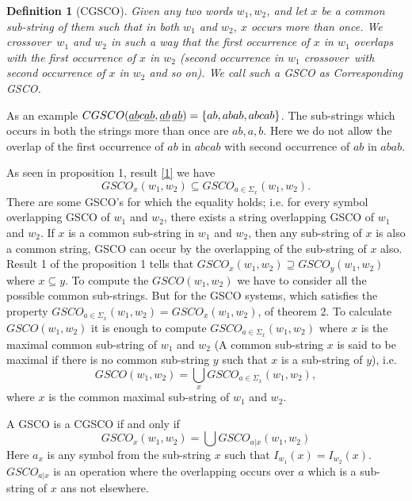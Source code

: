 \documentclass{llncs}
\newtheorem{defin}{Definition}
\newcommand{\sae}{crossover~}
\newcommand{\sg}{\Sigma}
\begin{document}
\begin{defin}[CGSCO]
Given any two words $w_1,w_2$, and let $x$ be a common sub-string of
them such that in both $w_1$ and $w_2,~x$ occurs more than once. We
\sae $w_1$ and $w_2$ in such a way that the first occurrence of $x$
in $w_1$ overlaps with the   first occurrence of $x$ in $w_2$
(second occurrence in $w_1$ \sae with second occurrence of $x$ in
$w_2$ and so on). We call such a GSCO as Corresponding GSCO.
\end{defin}
\par As an example $CGSCO(\underline{ab}c\underline{ab},
\underline{ab}\hspace{0.5mm}\underline{ab})=\{ab,abab,abcab\}$. The
sub-strings which occurs in both the strings more than once are
$ab,a , b$.
 Here we do not allow the overlap of the first occurrence of $ab$ in  $abcab$ with
 second occurrence of $ab$ in $abab$.
\par As seen in proposition 1, result \ref{1} we have
\[GSCO_x(w_1,w_2)\subseteq GSCO_{a\in\sg_x}(w_1,w_2).\]
There are some GSCO's for which the equality holds; i.e.
 for every symbol overlapping GSCO  of $w_1$ and $w_2$,
 there exists a string overlapping GSCO of  $w_1$ and $w_2$.
  If $x$ is a common sub-string in $w_1$ and $w_2$, then any
  sub-string of $x$ is also a common string, GSCO  can occur
  by the overlapping of the sub-string of $x$ also. Result 1
  of the proposition 1 tells that   $GSCO_x(w_1,w_2)\supseteq GSCO_y(w_1,w_2)$
  where $x\subseteq y$. To compute the $GSCO(w_1,w_2)$ we have to consider
   all the possible common sub-strings. But for the GSCO  systems, which
    satisfies the property $GSCO_{a\in\sg_x}(w_1,w_2)=GSCO_x(w_1,w_2)$, of
    theorem 2. To calculate $GSCO(w_1,w_2)$ it is enough to compute
    $GSCO_{a\in\sg_x}(w_1,w_2)$ where $x$ is the maximal common sub-string
    of $w_1$ and $w_2$ (A common sub-string $x$ is said to be maximal if there is no
     common sub-string $y$ such that $x$ is  a sub-string of $y$), i.e.
\[GSCO(w_1,w_2)=\bigcup_x GSCO_{a\in\sg_x}(w_1,w_2),\]
 where $x$ is the common maximal sub-string of $w_1$ and $w_2$.
\begin{theorem}
A GSCO is a CGSCO if and only if
\[GSCO_x(w_1,w_2)=\bigcup GSCO_{a|x}(w_1,w_2)\]
Here $a_x$ is any symbol from the sub-string $x$ such that
$I_{w_1}(x)=I_{w_2}(x)$. $GSCO_{a|x}$ is an operation where the
overlapping occurs over $a$ which is a sub-string of $x$ ans not
elsewhere.
\end{theorem}
\end{document}

